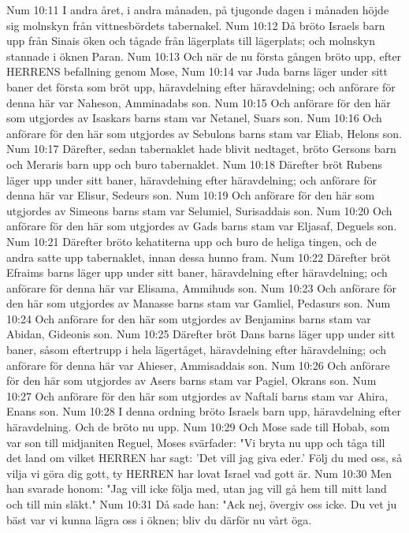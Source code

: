 Num 10:11  I andra året, i andra månaden, på tjugonde dagen i månaden höjde sig molnskyn från vittnesbördets tabernakel.
Num 10:12  Då bröto Israels barn upp från Sinais öken och tågade från lägerplats till lägerplats; och molnskyn stannade i öknen Paran.
Num 10:13  Och när de nu första gången bröto upp, efter HERRENS befallning genom Mose,
Num 10:14  var Juda barns läger under sitt baner det första som bröt upp, häravdelning efter häravdelning; och anförare för denna här var Naheson, Amminadabs son.
Num 10:15  Och anförare för den här som utgjordes av Isaskars barns stam var Netanel, Suars son.
Num 10:16  Och anförare för den här som utgjordes av Sebulons barns stam var Eliab, Helons son.
Num 10:17  Därefter, sedan tabernaklet hade blivit nedtaget, bröto Gersons barn och Meraris barn upp och buro tabernaklet.
Num 10:18  Därefter bröt Rubens läger upp under sitt baner, häravdelning efter häravdelning; och anförare för denna här var Elisur, Sedeurs son.
Num 10:19  Och anförare för den här som utgjordes av Simeons barns stam var Selumiel, Surisaddais son.
Num 10:20  Och anförare för den här som utgjordes av Gads barns stam var Eljasaf, Deguels son.
Num 10:21  Därefter bröto kehatiterna upp och buro de heliga tingen, och de andra satte upp tabernaklet, innan dessa hunno fram.
Num 10:22  Därefter bröt Efraims barns läger upp under sitt baner, häravdelning efter häravdelning; och anförare för denna här var Elisama, Ammihuds son.
Num 10:23  Och anförare för den här som utgjordes av Manasse barns stam var Gamliel, Pedasurs son.
Num 10:24  Och anförare for den här som utgjordes av Benjamins barns stam var Abidan, Gideonis son.
Num 10:25  Därefter bröt Dans barns läger upp under sitt baner, såsom eftertrupp i hela lägertåget, häravdelning efter häravdelning; och anförare för denna här var Ahieser, Ammisaddais son.
Num 10:26  Och anförare för den här som utgjordes av Asers barns stam var Pagiel, Okrans son.
Num 10:27  Och anförare för den här som utgjordes av Naftali barns stam var Ahira, Enans son.
Num 10:28  I denna ordning bröto Israels barn upp, häravdelning efter häravdelning. Och de bröto nu upp.
Num 10:29  Och Mose sade till Hobab, som var son till midjaniten Reguel, Moses svärfader: "Vi bryta nu upp och tåga till det land om vilket HERREN har sagt: 'Det vill jag giva eder.' Följ du med oss, så vilja vi göra dig gott, ty HERREN har lovat Israel vad gott är.
Num 10:30  Men han svarade honom: "Jag vill icke följa med, utan jag vill gå hem till mitt land och till min släkt."
Num 10:31  Då sade han: "Ack nej, övergiv oss icke. Du vet ju bäst var vi kunna lägra oss i öknen; bliv du därför nu vårt öga.
